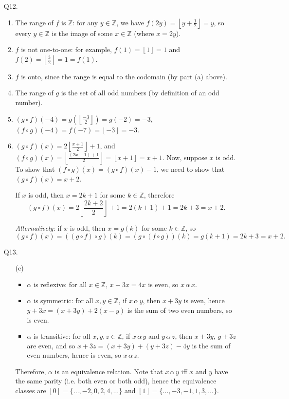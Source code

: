 \documentclass[a4paper,11pt]{article}
\newcommand{\Z}{\mathbb{Z}}
\newcommand{\floor}[1]{\left \lfloor #1 \right \rfloor}
\begin{document}
\begin{enumerate}
\item[Q12.]
\begin{enumerate}
\item The range of $f$ is $\Z$: for any $y \in \Z$, we have
$f(2y) = \floor{y+\frac{1}{2}} = y$, so every $y \in \Z$ is the image of
some $x \in \Z$ (where $x=2y$).
\item $f$ is not one-to-one: for example, $f(1) = \floor{1} = 1$ and
$f(2) = \floor{\frac{3}{2}} = 1 = f(1)$.
\item $f$ is onto, since the range is equal to the codomain (by part (a) above).
\item The range of $g$ is the set of all odd numbers (by definition of an odd
number).
\item $(g \circ f)(-4) = g\left( \floor{\frac{-3}{2}} \right) = g(-2) = -3$,
\quad
$(f \circ g)(-4) = f(-7) = \floor{-3} = -3$.
\item
$(g \circ f)(x) = 2 \floor{\frac{x+1}{2}} + 1$, and
$(f \circ g)(x) = \floor{\frac{(2x+1)+1}{2}} = \floor{x+1} = x+1$.
Now, suppose $x$ is odd. To show that $(f \circ g)(x) = (g \circ f)(x)-1$, we
need to show that $(g \circ f)(x) = x+2$.

If $x$ is odd, then $x = 2k+1$ for some $k \in \Z$, therefore
\[ (g \circ f)(x) = 2 \floor{\frac{2k+2}{2}} + 1 = 2 (k+1) + 1 = 2k+3 = x+2. \]

{\em Alternatively:} if $x$ is odd, then $x = g(k)$ for some $k \in \Z$,
so
\[ (g \circ f)(x) = ((g \circ f) \circ g)(k) = (g \circ (f \circ g))(k) = g(k+1) = 2k+3 = x+2. \]
\end{enumerate}

\item[Q13.]
\begin{enumerate}
\item[(c)]
\begin{itemize}
\item
$\alpha$ is reflexive: for all $x \in \Z$, $x+3x = 4x$ is even, so $x \,\alpha\, x$.
\item
$\alpha$ is symmetric: for all $x, y \in \Z$, if $x \, \alpha \, y$, then
$x+3y$ is even, hence $y+3x = (x+3y) + 2(x-y)$ is the sum of two even numbers,
so is even.
\item
$\alpha$ is transitive: for all $x, y, z \in \Z$, if $x \, \alpha \, y$ and
$y \,\alpha\, z$, then $x+3y$, $y+3z$ are even, and so
$x+3z = (x+3y) + (y+3z) - 4y$ is the sum of even numbers, hence is even, so
$x \,\alpha\, z$.
\end{itemize}
Therefore, $\alpha$ is an equivalence relation. Note that $x \,\alpha\, y$ iff
$x$ and $y$ have the same parity (i.e. both even or both odd), hence the
equivalence classes are $[0] = \{\dots, -2, 0, 2, 4, \dots\}$ and
$[1] = \{\dots, -3, -1, 1, 3, \dots\}$.
\end{enumerate}
\end{enumerate}
\end{document}

